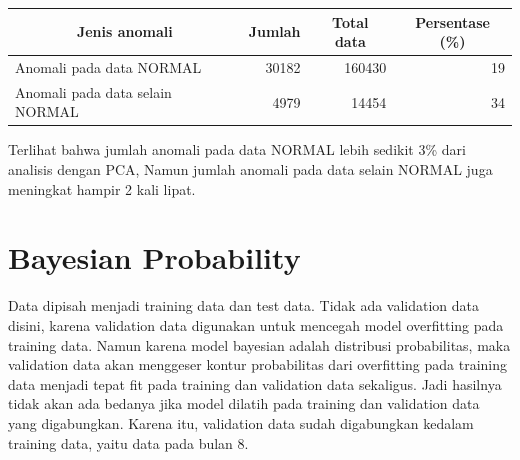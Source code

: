     \begin{table}[h]
        \centering
        \begin{tabular}{|l|r|r|r|}
            \hline
            \multicolumn{1}{|c|}{\textbf{Jenis anomali}} & \multicolumn{1}{c|}{\textbf{Jumlah}} & \multicolumn{1}{c|}{\textbf{Total data}} & \multicolumn{1}{c|}{\textbf{Persentase (\%)}} \\ \hline
            Anomali pada data NORMAL                     & 30182                                & 160430                                   & 19                                       \\ \hline
            Anomali pada data selain NORMAL              & 4979                                 & 14454                                    & 34                                       \\ \hline
        \end{tabular}
    \end{table}

    Terlihat bahwa jumlah anomali pada data NORMAL lebih sedikit 3\% dari analisis dengan PCA, Namun jumlah anomali pada data selain NORMAL juga meningkat hampir 2 kali lipat.

\section{Bayesian Probability}

Data dipisah menjadi training data dan test data. Tidak ada validation data disini, karena validation data digunakan untuk mencegah model overfitting pada training data. Namun karena model bayesian adalah distribusi probabilitas, maka validation data akan menggeser kontur probabilitas dari overfitting pada training data menjadi tepat fit pada training dan validation data sekaligus. Jadi hasilnya tidak akan ada bedanya jika model dilatih pada training dan validation data yang digabungkan. Karena itu, validation data sudah digabungkan kedalam training data, yaitu data pada bulan 8.

